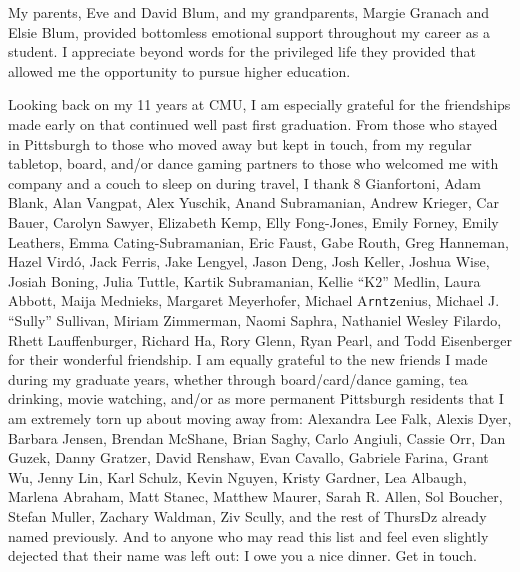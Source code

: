 \documentclass[12pt]{cmuthesis}
\begin{document}
\begin{acknowledgments}
{My parents, Eve and David Blum, and my grandparents, Margie Granach and Elsie Blum,
provided bottomless emotional support throughout my career as a student. %
I appreciate beyond words for the privileged life they provided
that allowed me the opportunity to pursue higher education.

Looking back on my 11 years at CMU,
I am especially grateful for the friendships made early on %
that continued well past first graduation.
From those who stayed in Pittsburgh %
to those who moved away but %
kept in touch,
from my regular tabletop, board, and/or dance gaming partners
to those who %
welcomed me with company and
a couch to sleep on during travel,
I thank
8 Gianfortoni,
Adam Blank,
Alan Vangpat,
Alex Yuschik,
Anand Subramanian,
Andrew Krieger,
Car Bauer,
Carolyn Sawyer,
Elizabeth Kemp,
Elly Fong-Jones,
Emily Forney,
Emily Leathers,
Emma Cating-Subramanian,
Eric Faust,
Gabe Routh,
Greg Hanneman,
Hazel Vird\'{o},
Jack Ferris,
Jake Lengyel,
Jason Deng,
Josh Keller,
Joshua Wise,
Josiah Boning,
Julia Tuttle,
Kartik Subramanian,
Kellie ``K2'' Medlin,
Laura Abbott,
Maija Mednieks,
Margaret Meyerhofer,
Michael A\texttt{rntz}enius,
Michael J. ``Sully'' Sullivan,
Miriam Zimmerman,
Naomi Saphra,
Nathaniel Wesley Filardo,
Rhett Lauffenburger,
Richard Ha,
Rory Glenn,
Ryan Pearl,
and
Todd Eisenberger
for their wonderful friendship.
I am equally grateful to the new friends I made during my graduate years,
whether through board/card/dance gaming, tea drinking, %
movie watching,
and/or as more permanent Pittsburgh residents that I am extremely torn up about moving away from:
Alexandra Lee Falk,
Alexis Dyer,
Barbara Jensen,
Brendan McShane,
Brian Saghy,
Carlo Angiuli,
Cassie Orr,
Dan Guzek,
Danny Gratzer,
David Renshaw,
Evan Cavallo,
Gabriele Farina,
Grant Wu,
Jenny Lin,
Karl Schulz,
Kevin Nguyen,
Kristy Gardner,
Lea Albaugh,
Marlena Abraham,
Matt Stanec,
Matthew Maurer,
Sarah R. Allen,
Sol Boucher,
Stefan Muller,
Zachary Waldman,
Ziv Scully,
and the rest of ThursDz already named previously.
And to anyone who may read this list
and feel even slightly dejected that their name was left out:
I owe you a nice dinner. Get in touch.

}
\end{acknowledgments}
\end{document}
